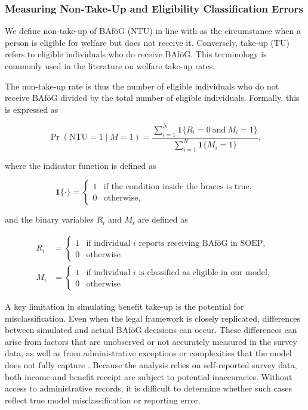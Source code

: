 \subsubsection{Measuring Non-Take-Up and Eligibility Classification Errors}

We define non-take-up of BAföG (NTU) in line with \cite{nelson_towards_2021} as the circumstance when a person is eligible for welfare but does not receive it. Conversely, take-up (TU) refers to eligible individuals who do receive BAföG. This terminology is commonly used in the literature on welfare take-up rates. 

The non-take-up rate is thus the number of eligible individuals who do not receive BAföG divided by the total number of eligible individuals. Formally, this is expressed as

\begin{equation}
\Pr(\text{NTU} = 1 \mid M = 1) = \frac{\sum_{i=1}^{N} \mathbf{1}\{R_i = 0 \ \text{and} \ M_i = 1\}}{\sum_{i=1}^{N} \mathbf{1}\{M_i = 1\}},
\end{equation}

where the indicator function is defined as

\begin{equation}
  \mathbf{1}\{\cdot\} =
  \begin{cases}
    1 & \text{if the condition inside the braces is true}, \\
    0 & \text{otherwise},
  \end{cases}
\end{equation}

and the binary variables \(R_i\) and \(M_i\) are defined as

\begin{equation}
\begin{aligned}
R_i &= \begin{cases}
1 & \text{if individual } i \text{ reports receiving BAföG in SOEP}, \\[4pt]
0 & \text{otherwise}
\end{cases} \\
M_i &= \begin{cases}
1 & \text{if individual } i \text{ is classified as eligible in our model}, \\[4pt]
0 & \text{otherwise}
\end{cases}
\end{aligned}
\end{equation}

A key limitation in simulating benefit take-up is the potential for misclassification. Even when the legal framework is closely replicated, differences between simulated and actual BAföG decisions can occur. These differences can arise from factors that are unobserved or not accurately measured in the survey data, as well as from administrative exceptions or complexities that the model does not fully capture \citep{frick_claim_2007, janssens_takemod_2022}. Because the analysis relies on self-reported survey data, both income and benefit receipt are subject to potential inaccuracies. Without access to administrative records, it is difficult to determine whether such cases reflect true model misclassification or reporting error.

